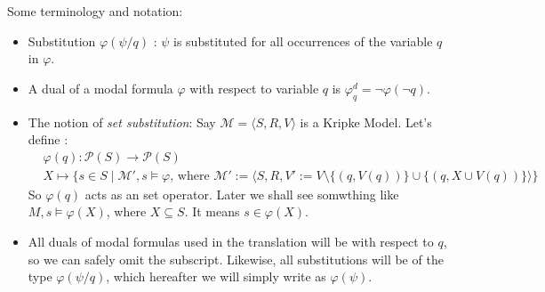 \documentclass[10pt]{article}
\renewcommand{\phi}{\varphi}
\begin{document}
		Some terminology and notation:
		\begin{itemize}
			\item Substitution $\phi(\psi/q)$ : $\psi$ is substituted for all occurrences of the variable $q$ in $\phi$.
			\item A dual of a modal formula $\phi$ with respect to variable $q$ is $\phi_q^d = \neg\phi(\neg q)$.
			\item The notion of \textit{set substitution}: Say $\mathcal{M} = \langle S,R,V \rangle$ is a Kripke Model. Let's define : 
			\begin{equation} 
				\begin{split}
					& \phi(q) : \mathcal{P}(S) \rightarrow \mathcal{P}(S)\\
					& X \mapsto \{s \in S \mid \mathcal{M'}, s \models \phi \text{, where } \mathcal{M'}:= \langle S, R, V' := V\setminus\{(q,V(q))\} \cup \{(q,X\cup V(q)) \} \rangle \}
				\end{split}
			\end{equation} 
			So $\phi(q)$ acts as an set operator. Later we shall see somwthing like $M,s\models \phi(X)$, where $X\subseteq S$. It means $s\in \phi(X)$.
			
			\item  All duals of modal formulas used in the translation will be with respect to
			$q$, so we can safely omit the subscript. Likewise, all substitutions will be of
			the type $\phi(\psi/q)$, which hereafter we will simply write as $\phi(\psi)$.
		\end{itemize}
		
\end{document}
